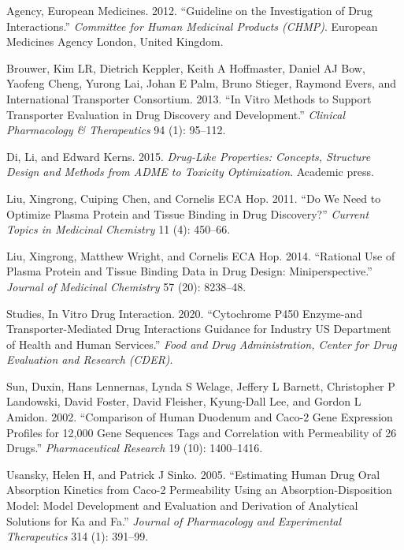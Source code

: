 \documentclass[
  11pt,
  krantz2, a4paper, twoside]{krantz}
\newlength{\cslhangindent}
\newlength{\cslentryspacingunit} %
\newenvironment{CSLReferences}[2] %
 {%
  \setlength{\parindent}{0pt}
  \ifodd #1
  \let\oldpar\par
  \def\par{\hangindent=\cslhangindent\oldpar}
  \fi
  \setlength{\parskip}{#2\cslentryspacingunit}
 }%
 {}
\begin{document}
\hypertarget{refs}{}
\begin{CSLReferences}{1}{0}
\leavevmode{}%
Agency, European Medicines. 2012. {``Guideline on the Investigation of Drug Interactions.''} \emph{Committee for Human Medicinal Products (CHMP)}. European Medicines Agency London, United Kingdom.

\leavevmode{}%
Brouwer, Kim LR, Dietrich Keppler, Keith A Hoffmaster, Daniel AJ Bow, Yaofeng Cheng, Yurong Lai, Johan E Palm, Bruno Stieger, Raymond Evers, and International Transporter Consortium. 2013. {``In Vitro Methods to Support Transporter Evaluation in Drug Discovery and Development.''} \emph{Clinical Pharmacology \& Therapeutics} 94 (1): 95--112.

\leavevmode{}%
Di, Li, and Edward Kerns. 2015. \emph{Drug-Like Properties: Concepts, Structure Design and Methods from ADME to Toxicity Optimization}. Academic press.

\leavevmode{}%
Liu, Xingrong, Cuiping Chen, and Cornelis ECA Hop. 2011. {``Do We Need to Optimize Plasma Protein and Tissue Binding in Drug Discovery?''} \emph{Current Topics in Medicinal Chemistry} 11 (4): 450--66.

\leavevmode{}%
Liu, Xingrong, Matthew Wright, and Cornelis ECA Hop. 2014. {``Rational Use of Plasma Protein and Tissue Binding Data in Drug Design: Miniperspective.''} \emph{Journal of Medicinal Chemistry} 57 (20): 8238--48.

\leavevmode{}%
Studies, In Vitro Drug Interaction. 2020. {``Cytochrome P450 Enzyme-and Transporter-Mediated Drug Interactions Guidance for Industry US Department of Health and Human Services.''} \emph{Food and Drug Administration, Center for Drug Evaluation and Research (CDER)}.

\leavevmode{}%
Sun, Duxin, Hans Lennernas, Lynda S Welage, Jeffery L Barnett, Christopher P Landowski, David Foster, David Fleisher, Kyung-Dall Lee, and Gordon L Amidon. 2002. {``Comparison of Human Duodenum and Caco-2 Gene Expression Profiles for 12,000 Gene Sequences Tags and Correlation with Permeability of 26 Drugs.''} \emph{Pharmaceutical Research} 19 (10): 1400--1416.

\leavevmode{}%
Usansky, Helen H, and Patrick J Sinko. 2005. {``Estimating Human Drug Oral Absorption Kinetics from Caco-2 Permeability Using an Absorption-Disposition Model: Model Development and Evaluation and Derivation of Analytical Solutions for Ka and Fa.''} \emph{Journal of Pharmacology and Experimental Therapeutics} 314 (1): 391--99.


\end{CSLReferences}
\end{document}
